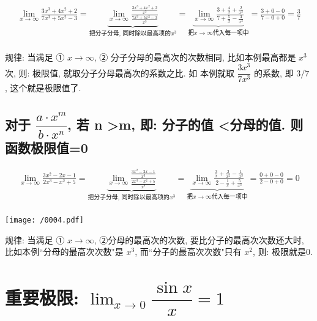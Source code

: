 \documentclass[UTF8]{ctexart}
\begin{document}
\begin{myEnvSample}
	\begin{align*}  %
			\lim_{x\rightarrow \infty}\frac{3x^3+4x^2+2}{7x^3+5x^2-3}=\underset{\text{把分子分母,\ 同时除以最高项的}x^3}{\underbrace{\lim_{x\rightarrow \infty}\frac{\frac{3x^3+4x^2+2}{x^3}}{\frac{7x^3+5x^2-3}{x^3}}}}=\underset{\text{把}x\rightarrow \infty \text{代入每一项中}}{\underbrace{\lim_{x\rightarrow \infty}\frac{3+\frac{4}{x}+\frac{2}{x^3}}{7+\frac{5}{x}-\frac{3}{x^3}}}}=\frac{3+0-0}{7-0+0}=\frac{3}{7}\\
		\end{align*}
	
	规律: 当满足 ①  $x \rightarrow \infty$, ② 分子分母的最高次的次数相同, 比如本例最高都是 $x^3$ 次, 则: 极限值, 就取分子分母最高次的系数之比. 如 本例就取 $\dfrac{3 x^3} {7 x^3}$ 的系数, 即 $3/7$ , 这个就是极限值了.
\end{myEnvSample}




\subsection{对于 $ \dfrac{a \cdot x^m}{b \cdot x^n} $, 若 n \textgreater m, 即: 分子的值 \textless 分母的值. 则函数极限值=0}

\begin{myEnvSample}
	\begin{align*}  %
			\lim_{x\rightarrow \infty}\frac{3x^2-2x-1}{2x^3-x^2+5}=\underset{\text{把分子分母,\ 同时除以最高项的}x^3}{\underbrace{\lim_{x\rightarrow \infty}\frac{\frac{3x^2-2x-1}{x^3}}{\frac{2x^3-x^2+5}{x^3}}}}=\underset{\text{把}x\rightarrow \infty \text{代入每一项中}}{\underbrace{\lim_{x\rightarrow \infty}\frac{\frac{3}{x}+\frac{2}{x^2}-\frac{1}{x^3}}{2-\frac{1}{x}+\frac{5}{x^3}}}}=\frac{0+0-0}{2-0+0}=0\\
	\end{align*}

	\texttt{[image: /0004.pdf]}
	
	规律: 当满足 ① $x \rightarrow \infty$, ②分母的最高次的次数, 要比分子的最高次次数还大时, 比如本例``分母的最高次次数"是 $x^3$, 而``分子的最高次次数"只有 $x^2$, 则: 极限就是0.
\end{myEnvSample}



\section{ 重要极限: $\boxed{\lim_{x \to 0} \dfrac{\sin x} {x} = 1} $}
\end{document}

